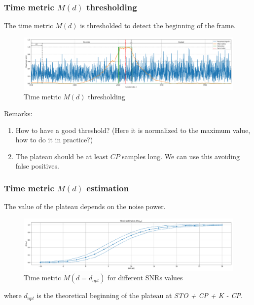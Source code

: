 \documentclass[10pt]{beamer}
\begin{document}
\begin{frame}
    \frametitle{Time metric $M(d)$ thresholding}
    The time metric $M(d)$ is thresholded to detect the beginning of the frame.
    \begin{figure}
        \centering
        \includegraphics[width=\textwidth]{schmidl_cox_plots/detection.pdf}
        \caption{Time metric $M(d)$ thresholding}
    \end{figure}
    Remarks:
    \begin{enumerate}
        \item How to have a good threshold? (Here it is normalized to the maximum value, how to do it in practice?)
        \item The plateau should be at least $CP$ samples long. We can use this avoiding false positives.
    \end{enumerate}
\end{frame}

\begin{frame}
    \frametitle{Time metric $M(d)$ estimation}
    The value of the plateau depends on the noise power.
    \begin{figure}
        \centering
        \includegraphics[width=\textwidth]{schmidl_cox_plots/metric_estimation.pdf}
        \caption{Time metric $M(d = d_{opt})$ for different SNRs values}
    \end{figure}
    where $d_{opt}$ is the theoretical beginning of the plateau at \textit{STO + CP + K - CP}. 
\end{frame}

\end{document}
